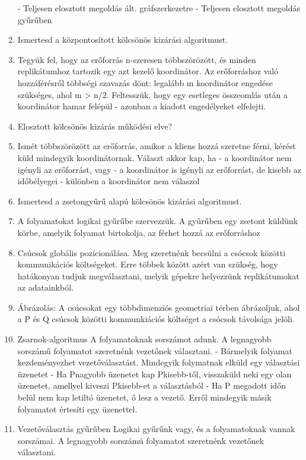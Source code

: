 \documentclass[twoside, a4paper, 12pt]{article}
\begin{document}
\begin{enumerate}
        - Teljesen elosztott megoldás ált. gráfszerkezetre
        - Teljesen elosztott megoldás gyűrűben
    \item  Ismertesd a központosított kölcsönös kizárási algoritmust.
    \item Tegyük fel, hogy az erőforrás n-szeresen többszörözött, és minden replikátumhoz tartozik egy azt kezelő koordinátor.
        Az erőforráshoz való hozzáférésről többségi szavazás dönt: legalább m koordinátor engedése szükséges, ahol m > n/2.
        Feltesszük, hogy egy esetleges összeomlás után a koordinátor hamar felépül - azonban a kiadott engedélyeket elfelejti.
    \item  Elosztott kölcsönös kizárás működési elve?
    \item Ismét többszörözött az erőforrás, amikor a kliens hozzá szeretne férni, kérést küld mindegyik koordinátornak. Választ akkor kap, ha
        - a koordinátor nem igényli az erőforrást, vagy
        - a koordinátor is igényli az erőforrást, de kisebb az időbélyegei
        - különben a koordinátor nem válaszol
    \item  Ismertesd a zsetongyűrű alapú kölcsönös kizárási algoritmust.
    \item A folyamatokat logikai gyűrűbe szervezzük. A gyűrűben egy zsetont küldünk körbe, amelyik folyamat birtokolja,
        az férhet hozzá az erőforráshoz
    \item  Csúcsok globális pozícionálása. Meg szeretnénk becsülni a csócsok közötti kommunikációs költségeket. Erre többek között azért van szükség, hogy hatákonyan
        tudjuk megválasztani, melyik gépekre helyezzünk replikátumokat az adatainkból.
    \item Ábrázolás: A csúcsokat egy többdimenziós geometriai térben ábrázoljuk, ahol a P és Q csúcsok közötti kommunkiációs költséget a csócsok távolsága jelöli.
    \item  Zsarnok-algoritmus
        A folyamatoknak sorszámot adunk. A legnagyobb sorszámű folyamatot szeretnénk vezetőnek választani.
        - Bármelyik folyamat kezdeményezhet vezetőválasztást. Mindegyik folymatnak elküld egy választási üzenetet
        - Ha Pnagyobb üzenetet kap Pkisebb-től, visszaküld neki egy olan üzenetet, amellyel kiveszi Pkisebb-et a választásból
        - Ha P megadott időn belül nem kap letiltó üzenetet, ő lesz a vezető. Erről mindegyik másik folyamatot értesíti egy üzenettel.
    \item  Vezetőválasztás gyűrűben
        Logikai gyűrűnk vagy, és a folyamatoknak vannak sorszámai. A legnagyobb sorszámú folyamatot szeretnénk vezetőnek választani.

\end{enumerate}
\end{document}
